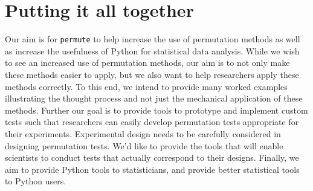 \section{Putting it all together}

Our aim is for \texttt{permute} to help increase the use of permutation methods
as well as increase the usefulness of Python for statistical data analysis.
While we wish to see an increased use of permutation methods, our aim is to not
only make these methods easier to apply, but we also want to help researchers
apply these methods correctly.  To this end, we intend to provide
many worked examples illustrating the thought process and not just the mechanical
application of these methods.  Further our goal is to provide tools to
prototype and implement custom tests such that researchers can easily develop
permutation tests appropriate for their experiments.  Experimental design needs
to be carefully considered in designing permutation tests. We'd like to provide
the tools that will enable scientists to conduct tests that actually correspond
to their designs.  Finally, we aim to provide Python tools to
statisticians, and provide better statistical tools to Python users.
